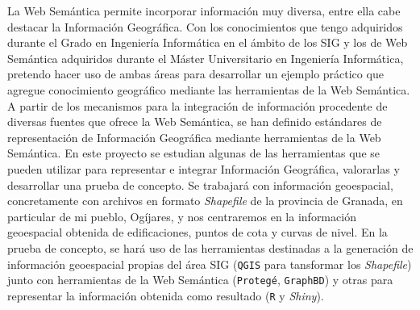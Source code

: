 


La Web Semántica permite incorporar información muy diversa, entre ella cabe destacar la Información Geográfica. Con los conocimientos que tengo adquiridos durante el Grado en Ingeniería Informática en el ámbito de los SIG y los de Web Semántica adquiridos durante el Máster Universitario en Ingeniería Informática, pretendo hacer uso de ambas áreas para desarrollar un ejemplo práctico que agregue conocimiento geográfico mediante las herramientas de la Web Semántica. \\ %

A partir de los mecanismos para la integración de información procedente de diversas fuentes que ofrece la Web Semántica, se han definido estándares de representación de Información Geográfica mediante herramientas de la Web Semántica. En este proyecto se estudian algunas de las herramientas que se pueden utilizar para representar e integrar Información Geográfica, valorarlas y desarrollar una prueba de concepto. Se trabajará con información geoespacial, concretamente con archivos en formato \textit{Shapefile} de la provincia de Granada, en particular de mi pueblo, Ogíjares, y nos centraremos en la información geoespacial obtenida de edificaciones, puntos de cota y curvas de nivel. En la prueba de concepto, se hará uso de las herramientas destinadas a la generación de información geoespacial propias del área SIG (\texttt{QGIS} para tansformar los \textit{Shapefile}) junto con herramientas de la Web Semántica (\texttt{Protegé}, \texttt{GraphBD}) y otras para representar la información obtenida como resultado (\texttt{R} y \textit{Shiny}). 

